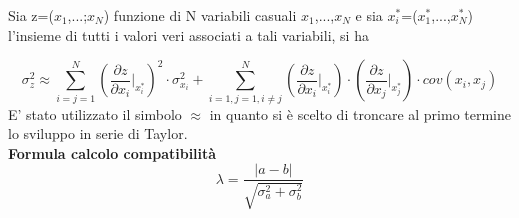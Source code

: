 \documentclass[a4paper,11pt,oneside]{article}
\begin{document}
Sia z=($x_1$,...;$x_N$) funzione di N variabili casuali $x_1$,...,$x_N$ e sia ${x_i^\ast}$=($x_1^\ast$,...,$x_N^{\ast}$) l'insieme di tutti i valori veri associati a tali variabili, si ha 

\begin{equation*}
    \sigma_z^{2}\approx  \sum_{i=j=1}^{N}\left ( \frac{\partial z}{\partial x_i}\Big|_{x_i^{\ast}} \right )^{2}\cdot\sigma_{x_i}^{2} +\sum_{i=1,j=1,i\neq j}^{N}\left (\frac{\partial z }{\partial x_i}\Big|_{x_i^{\ast}} \right ) \cdot \left ( \frac{\partial z}{\partial x_j} \Big|_{x_j^{\ast}} \right )\cdot cov(x_i,x_j)\label{eq:prop_errori}
\end{equation*}
E' stato utilizzato il simbolo $\approx$ in quanto si è scelto di troncare al primo termine lo sviluppo in serie di Taylor.\\


\textbf{Formula calcolo compatibilità}\\
\begin{equation*}
    \lambda=\frac{\left|a-b\right|}{\sqrt{\sigma^{2}_{a}+\sigma^{2}_{b}}}
\end{equation*}\\
\end{document}

